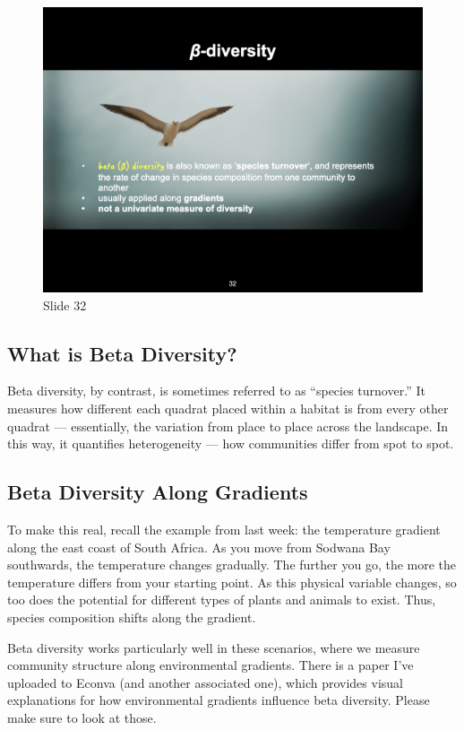 \documentclass[
  12pt,
]{book}
\begin{document}
\begin{figure}[ht]
\centering
\includegraphics[width=0.8\linewidth]{../images/BDC334/BDC334-032.jpeg}
\caption*{Slide 32}
\end{figure}

\subsection{What is Beta Diversity?}\label{what-is-beta-diversity}

Beta diversity, by contrast, is sometimes referred to as ``species
turnover.'' It measures how different each quadrat placed within a
habitat is from every other quadrat --- essentially, the variation from
place to place across the landscape. In this way, it quantifies
heterogeneity --- how communities differ from spot to spot.

\subsection{Beta Diversity Along
Gradients}\label{beta-diversity-along-gradients}

To make this real, recall the example from last week: the temperature
gradient along the east coast of South Africa. As you move from Sodwana
Bay southwards, the temperature changes gradually. The further you go,
the more the temperature differs from your starting point. As this
physical variable changes, so too does the potential for different types
of plants and animals to exist. Thus, species composition shifts along
the gradient.

Beta diversity works particularly well in these scenarios, where we
measure community structure along environmental gradients. There is a
paper I've uploaded to Econva (and another associated one), which
provides visual explanations for how environmental gradients influence
beta diversity. Please make sure to look at those.
\end{document}
